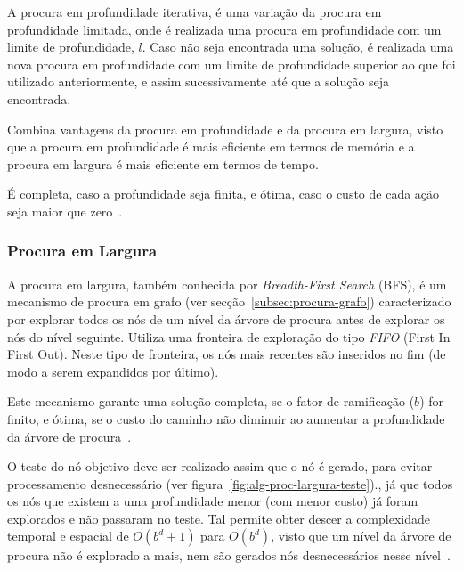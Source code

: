 A procura em profundidade iterativa, é uma variação da procura em profundidade limitada, onde é realizada uma procura em profundidade com um limite de profundidade, $l$.
Caso não seja encontrada uma solução, é realizada uma nova procura em profundidade com um limite de profundidade superior ao que foi utilizado anteriormente, e assim sucessivamente até que a solução seja encontrada.

Combina vantagens da procura em profundidade e da procura em largura, visto que a procura em profundidade é mais eficiente em termos de memória e a procura em largura é mais eficiente em termos de tempo.

É completa, caso a profundidade seja finita, e ótima, caso o custo de cada ação seja maior que zero~\cite{ist:leic:resumos:procura-cega}.

\subsubsection{Procura em Largura}\label{subsubsec:procura-largura}

A procura em largura, também conhecida por \textit{Breadth-First Search} (BFS), é um mecanismo de procura em grafo (ver secção~\ref{subsec:procura-grafo}) caracterizado por explorar todos os nós de um nível da árvore de procura antes de explorar os nós do nível seguinte. Utiliza uma fronteira de exploração do tipo \textit{FIFO} (First In First Out). Neste tipo de fronteira, os nós mais recentes são inseridos no fim (de modo a serem expandidos por último).

Este mecanismo garante uma solução completa, se o fator de ramificação ($b$) for finito, e ótima, se o custo do caminho não diminuir ao aumentar a profundidade da árvore de procura~\cite{ist:leic:resumos:procura-cega}.

O teste do nó objetivo deve ser realizado assim que o nó é gerado, para evitar processamento desnecessário (ver figura~\ref{fig:alg-proc-largura-teste}).,
já que todos os nós que existem a uma profundidade menor (com menor custo) já foram explorados e não passaram no teste.
Tal permite obter descer a complexidade temporal e espacial de $O(b^d+1)$ para $O(b^d)$, visto que um nível da árvore de procura não é explorado a mais, nem são gerados nós desnecessários nesse nível~\cite{ist:leic:resumos:procura-cega}.

